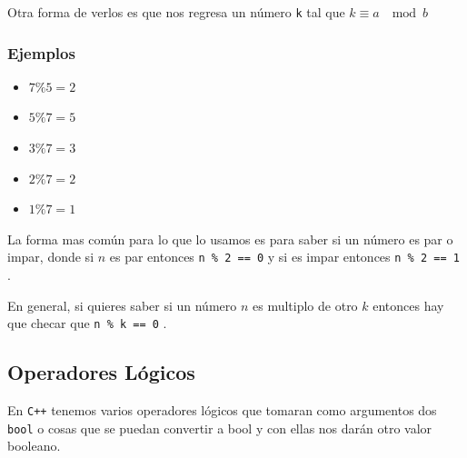 \documentclass[12pt, fleqn]{report}                             %
\theoremstyle{break}                                            %
\newcommand{\textCode}[1]  { \texttt{#1} }                      %
\newcommand \Cpp  {\textCode{C++} }                               %
\begin{document}
                    Otra forma de verlos es que nos regresa un número \textCode{k}
                    tal que $k \equiv a \; \mod b$

                \subsubsection{Ejemplos}
                
                    \begin{itemize}
                        \item $7 \% 5 = 2$
                        \item $5 \% 7 = 5$
                        \item $3 \% 7 = 3$
                        \item $2 \% 7 = 2$
                        \item $1 \% 7 = 1$
                    \end{itemize}

                    La forma mas común para lo que lo usamos
                    es para saber si un número es par o impar, donde
                    si $n$ es par entonces \textCode{n \% 2 == 0} y si es impar
                    entonces \textCode{n \% 2 == 1}.

                    En general, si quieres saber si un número $n$ es multiplo de 
                    otro $k$ entonces hay que checar que \textCode{n \% k == 0}.

            \clearpage
            \subsection{Operadores Lógicos}

                En \Cpp tenemos varios operadores lógicos que tomaran como argumentos dos 
                \textCode{bool} o cosas que se puedan convertir a bool y con ellas nos darán otro
                valor booleano.
\end{document}
